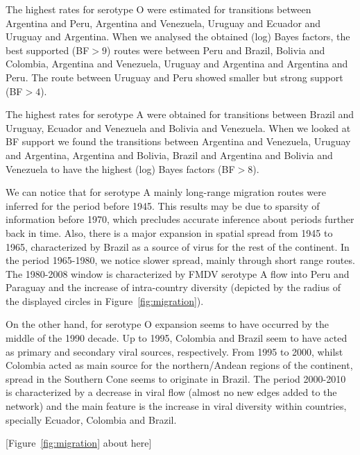 \documentclass[10pt]{article}
\begin{document}
The highest rates for serotype O were estimated for transitions between Argentina and Peru, Argentina and Venezuela, Uruguay and Ecuador and Uruguay and Argentina.
When we analysed the obtained (log) Bayes factors, the best supported (BF$>9$) routes were between Peru and Brazil, Bolivia and Colombia, Argentina and Venezuela, Uruguay and Argentina and Argentina and Peru. The route between Uruguay and Peru showed smaller but strong support (BF$>4$).

The highest rates for serotype A were obtained for transitions between Brazil and Uruguay, Ecuador and Venezuela and Bolivia and Venezuela.
When we looked at BF support we found the transitions between Argentina and Venezuela, Uruguay and Argentina, Argentina and Bolivia, Brazil and Argentina and Bolivia and Venezuela to have the highest (log) Bayes factors (BF$>8$).

We can notice that for serotype A mainly long-range migration routes were inferred for the period before 1945.
This results may be due to sparsity of information before 1970, which precludes accurate inference about periods further back in time. 
Also, there is a major expansion in spatial spread from 1945 to 1965, characterized by Brazil as a source of virus for the rest of the continent.
In the period 1965-1980, we notice slower spread, mainly through short range routes.
The 1980-2008 window is characterized by FMDV serotype A flow into Peru and Paraguay and the increase of intra-country diversity (depicted by the radius of the displayed circles in Figure~\ref{fig:migration}).   

On the other hand, for serotype O expansion seems to have occurred by the middle of the 1990 decade.
Up to 1995, Colombia and Brazil seem to have acted as primary and secondary viral sources, respectively.
From 1995 to 2000, whilst Colombia acted as main source for the northern/Andean regions of the continent, spread in the Southern Cone seems to originate in Brazil.
The period 2000-2010 is characterized by a decrease in viral flow (almost no new edges added to the network) and the main feature is the increase in viral diversity within countries, specially Ecuador, Colombia and Brazil.

\begin{center}
 [Figure~\ref{fig:migration} about here]
\end{center}
\end{document}
